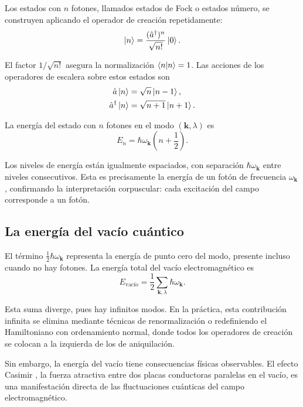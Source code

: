         Los estados con $n$ fotones, llamados estados de Fock o estados número, se construyen aplicando el operador de creación repetidamente:
        \begin{equation}
            \ket{n} = \frac{(\hat{a}^\dagger)^n}{\sqrt{n!}}\ket{0}.
        \end{equation}
        
        El factor $1/\sqrt{n!}$ asegura la normalización $\braket{n|n} = 1$. Las acciones de los operadores de escalera sobre estos estados son
        \begin{align}
            \hat{a}\ket{n} &= \sqrt{n}\ket{n-1}, \\
            \hat{a}^\dagger\ket{n} &= \sqrt{n+1}\ket{n+1}.
        \end{align}
        
        La energía del estado con $n$ fotones en el modo $(\mathbf{k}, \lambda)$ es
        \begin{equation}
            E_n = \hbar\omega_{\mathbf{k}}\left(n + \frac{1}{2}\right).
        \end{equation}
        
        Los niveles de energía están igualmente espaciados, con separación $\hbar\omega_{\mathbf{k}}$ entre niveles consecutivos. Esta es precisamente la energía de un fotón de frecuencia $\omega_{\mathbf{k}}$, confirmando la interpretación corpuscular: cada excitación del campo corresponde a un fotón.

    \subsection{La energía del vacío cuántico}
        
        El término $\frac{1}{2}\hbar\omega_{\mathbf{k}}$ representa la energía de punto cero del modo, presente incluso cuando no hay fotones. La energía total del vacío electromagnético es
        \begin{equation}
            E_{\text{vacío}} = \frac{1}{2}\sum_{\mathbf{k},\lambda} \hbar\omega_{\mathbf{k}}.
        \end{equation}
        
        Esta suma diverge, pues hay infinitos modos. En la práctica, esta contribución infinita se elimina mediante técnicas de renormalización o redefiniendo el Hamiltoniano con ordenamiento normal, donde todos los operadores de creación se colocan a la izquierda de los de aniquilación.
        
        Sin embargo, la energía del vacío tiene consecuencias físicas observables. El efecto Casimir \cite{Casimir1948}, la fuerza atractiva entre dos placas conductoras paralelas en el vacío, es una manifestación directa de las fluctuaciones cuánticas del campo electromagnético.


